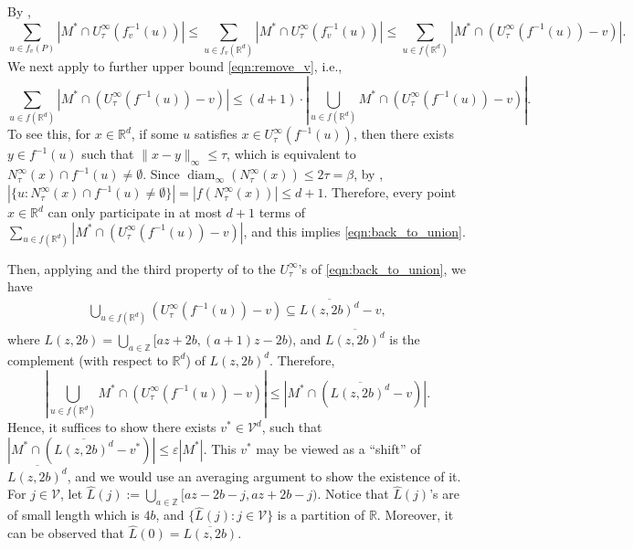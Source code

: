 \documentclass[11pt,letterpaper]{article}
\theoremstyle{plain}
\theoremstyle{definition}
\theoremstyle{remark}
\def\ZZ{{\mathbb{Z}}}
\DeclareMathOperator{\diam}{diam}
\renewcommand{\epsilon}{\ensuremath{\varepsilon}}
\let\epsilon\varepsilon
\begin{document}
By ,
\begin{equation}
    \label{eqn:remove_v}
    \sum_{u \in f_v(P)} |M^* \cap U_\tau^\infty(f_v^{-1}(u))|
    \leq \sum_{u \in f_v(\mathbb{R}^d)} |M^* \cap U_\tau^\infty(f_v^{-1}(u))|
    \leq \sum_{u \in f(\mathbb{R}^d)} |M^* \cap (U_\tau^\infty(f^{-1}(u)) - v)|.
\end{equation}
We next apply  to further upper bound \eqref{eqn:remove_v}, i.e.,
\begin{equation}
    \label{eqn:back_to_union}
    \sum_{u \in f(\mathbb{R}^d)} |M^* \cap (U_\tau^\infty(f^{-1}(u)) - v)|
    \leq 
    (d + 1) \cdot \left| \bigcup_{u \in f(\mathbb{R}^d)} M^* \cap (U_\tau^\infty(f^{-1}(u)) - v) \right|.
\end{equation}
    To see this, for $x \in \mathbb{R}^d$,
    if some $u$ satisfies $x \in U_\tau^\infty(f^{-1}(u))$,
    then there exists $y \in f^{-1}(u)$ such that $\|x - y\|_\infty \leq \tau$,
    which is equivalent to $N_\tau^\infty(x) \cap f^{-1}(u) \neq \emptyset$.
    Since $\diam_\infty(N_\tau^\infty(x)) \leq 2\tau = \beta$,
    by ,
    $ |\{u : N_\tau^\infty(x) \cap f^{-1}(u) \neq \emptyset \}|
    = |f(N_\tau^\infty(x))| \leq d+ 1$.
    Therefore,
    every point $x \in \mathbb{R}^d$ can only participate in at most $ d + 1$ terms of
    $\sum_{u \in f(\mathbb{R}^d)} |M^* \cap (U_\tau^\infty(f^{-1}(u)) - v)|$,
    and this implies \eqref{eqn:back_to_union}.


Then, 
applying  and the third property of  to the $U_\tau^\infty$'s of \eqref{eqn:back_to_union},
we have
\begin{align*}
    \bigcup_{u \in f(\mathbb{R}^d)} (U_\tau^\infty(f^{-1}(u)) - v)
    \subseteq \overline{L(z, 2b)^d} - v,
\end{align*}
where $L(z, 2b) = \bigcup_{a \in \ZZ} [az + 2b, (a + 1)z - 2b)$,
and $\overline{L(z, 2b)^d}$ is the complement (with respect to $\mathbb{R}^d$) of $L(z, 2b)^d$.
Therefore,
\begin{equation}
    \label{eqn:to_shift}
    \left| \bigcup_{u \in f(\mathbb{R}^d)} M^* \cap (U_\tau^\infty(f^{-1}(u)) - v) \right|
    \leq \left| M^* \cap (\overline{L(z, 2b)^d} - v) \right|.
\end{equation}
Hence, it suffices to show there exists $v^* \in \mathcal{V}^d$,
such that $|M^* \cap (\overline{L(z, 2b)^d} - v^*)| \leq \epsilon |M^*|$.
This $v^*$ may be viewed as a ``shift'' of $\overline{L(z, 2b)^d}$,
and we would use an averaging argument to show the existence of it.
For $j \in \mathcal{V}$, let $\hat{L}(j) := \bigcup_{a \in \ZZ}[az - 2b - j, az + 2b - j)$.
Notice that $\hat{L}(j)$'s are of small length which is $4b$,
and $\{ \hat{L}(j) : j \in \mathcal{V} \}$ is a partition of $\mathbb{R}$.
Moreover, it can be observed that $\hat{L}(0) = \overline{L(z, 2b)}$.
\end{document}
